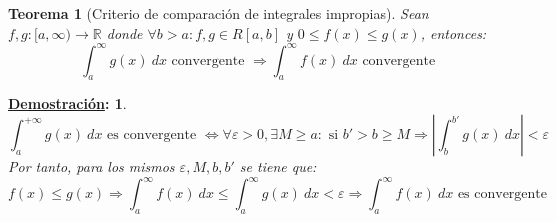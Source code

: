 \documentclass[10pt,a4paper,openright]{book}
\theoremstyle{break}
\newtheorem*{theo}{Teorema}
\newtheorem*{demo}{\underline{Demostración}:}
\newcommand{\dif}[1]{\ d#1}
\begin{document}
\begin{theo}[Criterio de comparación de integrales impropias]
Sean $f,g: [a, \infty)\rightarrow \mathbb R$ donde $\forall b> a: f,g\in R[a,b]$ y $0\leq f(x)\leq g(x)$, entonces:
$$\int_{a}^{\infty} g(x) \dif{x} \mbox{ convergente }\Rightarrow \int_{a}^{\infty} f(x) \dif{x} \mbox{ convergente } $$
\end{theo}
\begin{demo}
$$\int_{a}^{+\infty} g(x) \dif{x}\mbox{ es convergente }\Leftrightarrow \forall \varepsilon > 0, \exists M \geq a: \mbox{ si } b'>b\geq M \Rightarrow \left| \int_{b}^{b'} g(x)\dif{x} \right|< \varepsilon $$
Por tanto, para los mismos $\varepsilon, M, b, b'$ se tiene que:
$$f(x)\leq g(x) \Rightarrow \int_{a}^{\infty} f(x) \dif{x} \leq \int_{a}^{\infty} g(x) \dif{x} < \varepsilon\Rightarrow \int_{a}^{\infty} f(x) \dif{x} \mbox{ es convergente}$$
\end{demo}
\end{document}
